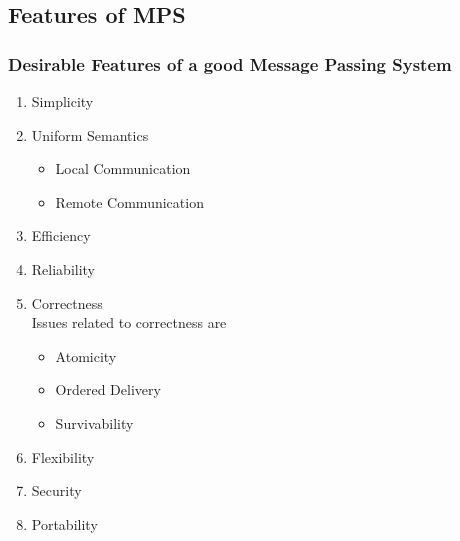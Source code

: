 \documentclass{beamer}
\begin{document}
\subsection{Features of MPS}
\begin{frame}
	\frametitle{Desirable Features of a good Message Passing System}
	\begin{enumerate}
		\item Simplicity
		\item Uniform Semantics
		\begin{itemize}
			\item Local Communication
			\item Remote Communication
		\end{itemize}
		\item Efficiency
		\item Reliability
		\item Correctness\\
			Issues related to correctness are
		\begin{itemize}
			\item Atomicity
			\item Ordered Delivery
			\item Survivability
		\end{itemize}
		\item Flexibility
		\item Security
		\item Portability
	\end{enumerate}
\end{frame}
\end{document}
